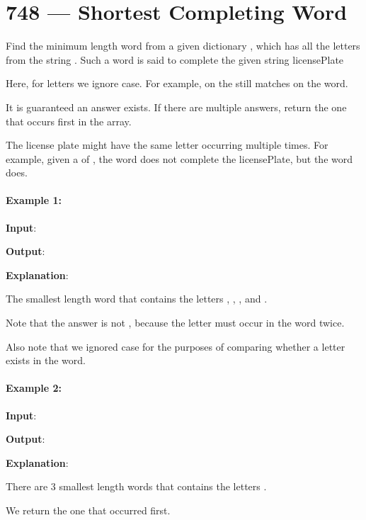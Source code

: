 \section{748 --- Shortest Completing Word}
Find the minimum length word from a given dictionary , which has all the letters from the string . Such a word is said to complete the given string licensePlate

Here, for letters we ignore case. For example,  on the  still matches  on the word.

It is guaranteed an answer exists. If there are multiple answers, return the one that occurs first in the array.

The license plate might have the same letter occurring multiple times. For example, given a  of , the word  does not complete the licensePlate, but the word  does.

\paragraph{Example 1:}
\begin{flushleft}


\textbf{Input}: 



\textbf{Output}: 

\textbf{Explanation}: 

The smallest length word that contains the letters , , , and .

Note that the answer is not , because the letter  must occur in the word twice.

Also note that we ignored case for the purposes of comparing whether a letter exists in the word.
\end{flushleft}

\paragraph{Example 2:}
\begin{flushleft}

\textbf{Input}: 



\textbf{Output}: 

\textbf{Explanation}: 

There are 3 smallest length words that contains the letters .

We return the one that occurred first.
\end{flushleft}

